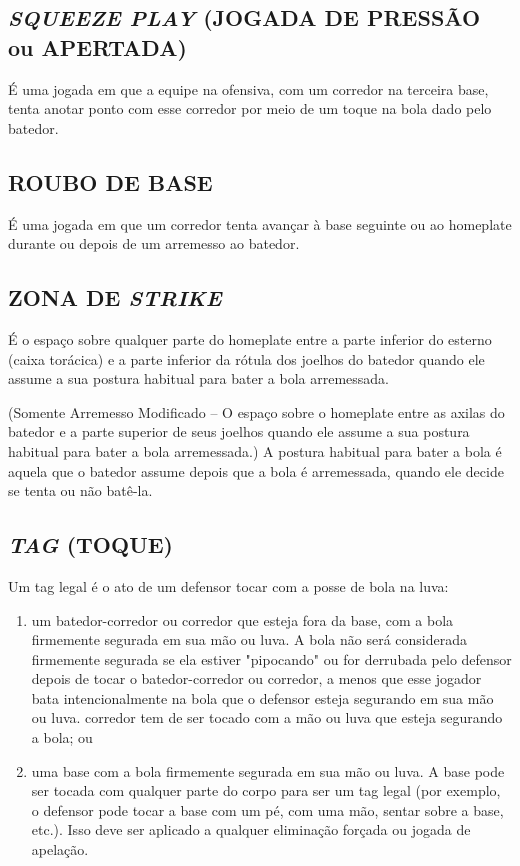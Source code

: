 \subsection{\textit{SQUEEZE PLAY} (JOGADA DE PRESSÃO ou APERTADA)}

É uma jogada em que a equipe na ofensiva, com um corredor na terceira base, tenta anotar ponto com esse corredor por meio de um toque na bola dado pelo batedor.

\subsection{ROUBO DE BASE}

É uma jogada em que um corredor tenta avançar à base seguinte ou ao \gls{homeplate} durante ou depois de um arremesso ao batedor.

\subsection{ZONA DE \textit{STRIKE}}

É o espaço sobre qualquer parte do \gls{homeplate} entre a parte inferior do esterno (caixa torácica) e a parte inferior da rótula dos joelhos do batedor quando ele  assume a sua postura habitual para bater a bola arremessada.

(Somente Arremesso Modificado -- O espaço sobre o \gls{homeplate} entre as axilas do batedor e a parte superior de seus joelhos quando ele assume a sua postura habitual para bater a bola arremessada.) A postura habitual para bater a bola é aquela que o batedor assume depois que a bola é arremessada, quando ele decide se tenta ou não batê-la.

\subsection{\textit{TAG} (TOQUE)}

Um \gls{tag} legal é o ato de um defensor tocar com a posse de bola na luva:

\begin{enumerate}[label=(\alph*)]
	\item   um batedor-corredor ou corredor que esteja fora da base, com a bola firmemente segurada em sua mão ou luva. A bola não será considerada firmemente segurada se ela estiver "pipocando" ou for derrubada pelo defensor  depois de tocar o batedor-corredor ou corredor, a menos que esse jogador bata intencionalmente na bola que o defensor esteja segurando em sua mão ou luva. corredor tem de ser tocado com a mão ou luva que esteja segurando a bola; ou
	\item  uma base com a bola firmemente segurada em sua mão ou luva. A base pode ser tocada com qualquer parte do corpo para ser um \gls{tag} legal (por exemplo, o defensor pode tocar a base com um pé, com uma mão, sentar sobre a base,  etc.). Isso deve ser aplicado a qualquer eliminação forçada ou jogada de apelação.
\end{enumerate}


